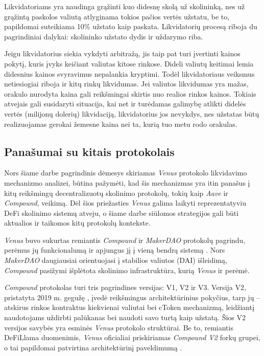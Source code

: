 \documentclass[]{VUMIFTemplateClass}
\begin{document}
Likvidatoriams yra naudinga grąžinti kuo didesnę skolą už skolininką, nes už grąžintą paskolos valiutą atlyginama tokios pačios vertės užstatu, be to, papildomai suteikiama 10\% užstato kaip paskata. Likvidatorių procesą riboja du pagrindiniai dalykai: skolininko užstato dydis ir uždarymo riba.

Jeigu likvidatorius siekia vykdyti arbitražą, jis taip pat turi įvertinti kainos pokytį, kuris įvyks keičiant valiutas kitose rinkose. Dideli valiutų keitimai lemia didesnius kainos svyravimus nepalankia kryptimi. Todėl likvidatoriaus veiksmus netiesiogiai riboja ir kitų rinkų likvidumas. Jei valiutos likvidumas yra mažas, orakulo nurodyta kaina gali reikšmingai skirtis nuo realios rinkos kainos. Tokiais atvejais gali susidaryti situacija, kai net ir turėdamas galimybę atlikti didelės vertės (milijonų dolerių) likvidaciją, likvidatorius jos nevykdys, nes užstatas būtų realizuojamas gerokai žemesne kaina nei ta, kurią tuo metu rodo orakulas. 

\subsection{Panašumai su kitais protokolais}

Nors šiame darbe pagrindinis dėmesys skiriamas \textit{Venus} protokolo likvidavimo mechanizmo analizei, būtina pažymėti, kad šis mechanizmas yra itin panašus į kitų reikšmingų decentralizuotų skolinimo protokolų, tokių kaip \textit{Aave} ir \textit{Compound}, veikimą. Dėl šios priežasties \textit{Venus} galima laikyti reprezentatyviu DeFi skolinimo sistemų atveju, o šiame darbe siūlomos strategijos gali būti aktualios ir taikomos kitų protokolų kontekste.

\textit{Venus} buvo sukurtas remiantis \textit{Compound} ir \textit{MakerDAO} protokolų pagrindu, perėmus jų funkcionalumą ir apjungus jį į vieną bendrą sistemą \cite{whatisvenus}. Nors \textit{MakerDAO} daugiausiai orientuojasi į stabilios valiutos (DAI) išleidimą, \textit{Compound} pasižymi išplėtota skolinimo infrastruktūra, kurią \textit{Venus} ir perėmė.

\textit{Compound} protokolas turi tris pagrindines versijas: V1, V2 ir V3. Versija V2, pristatyta 2019 m. gegužę \cite{compound2launch}, įvedė reikšmingus architektūrinius pokyčius, tarp jų – atskirus rinkos kontraktus kiekvienai valiutai bei cToken mechanizmą, leidžiantį naudotojams uždirbti palūkanas bei naudoti savo turtą kaip užstatą. Šios V2 versijos savybės yra esminės \textit{Venus} protokolo struktūrai. Be to, remiantis DeFiLlama duomenimis, \textit{Venus} oficialiai priskiriamas \textit{Compound V2} forkų grupei, o tai papildomai patvirtina architektūrinį paveldimumą \cite{venuscompoundfork}.
\end{document}
